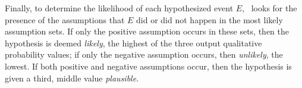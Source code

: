 {Finally, to determine the likelihood of each hypothesized event $E$,
\mifd\ looks for the presence of the assumptions that $E$ did or did
not happen in the most likely assumption sets. If only the positive
assumption occurs in these sets, then the hypothesis is deemed
\emph{likely}, the highest of the three output qualitative probability
values; if only the negative assumption occurs, then \emph{unlikely},
the lowest. If both positive and negative assumptions occur, then the
hypothesis is given a third, middle value \emph{plausible}.}



